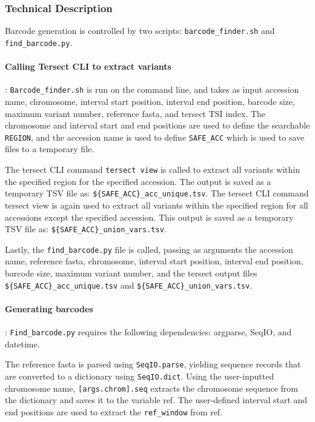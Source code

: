 \documentclass[12pt]{article}
\begin{document}
\subsubsection{Technical Description}

Barcode generation is controlled by two scripts: \verb+barcode_finder.sh+ and \verb+find_barcode.py+. 

\paragraph{Calling Tersect CLI to extract variants}: 
\verb+Barcode_finder.sh+ is run on the command line, and takes as input accession name, chromosome, interval start position, interval end position, barcode size, maximum variant number, reference fasta, and tersect TSI index. The chromosome and interval start and end positions are used to define the searchable \verb+REGION+, and the accession name is used to define \verb+SAFE_ACC+ which is used to save files to a temporary file.  

The tersect CLI command \verb+tersect view+  is called to extract all variants within the specified region for the specified accession. The output is saved as a temporary TSV file as: \verb+${SAFE_ACC}_acc_unique.tsv+. The tersect CLI command tersect view is again used to extract all variants within the specified region for all accessions except the specified accession. This output is saved as a temporary TSV file as: \verb+${SAFE_ACC}_union_vars.tsv+.  

Lastly, the \verb+find_barcode.py+ file is called, passing as arguments the accession name, reference fasta, chromosome, interval start position, interval end position, barcode size, maximum variant number, and the tersect output files  \verb+${SAFE_ACC}_acc_unique.tsv+ and  \verb+${SAFE_ACC}_union_vars.tsv+. 

\paragraph{Generating barcodes}: 
\verb+Find_barcode.py+ requires the following dependencies: argparse, SeqIO, and datetime.  

The reference fasta is parsed using \verb+SeqIO.parse+, yielding sequence records that are converted to a dictionary using \verb+SeqIO.dict+. Using the user-inputted chromosome name, \verb+[args.chrom].seq+ extracts the chromosome sequence from the dictionary and saves it to the variable ref. The user-defined interval start and end positions are used to extract the \verb+ref_window+ from ref. 
\end{document}
